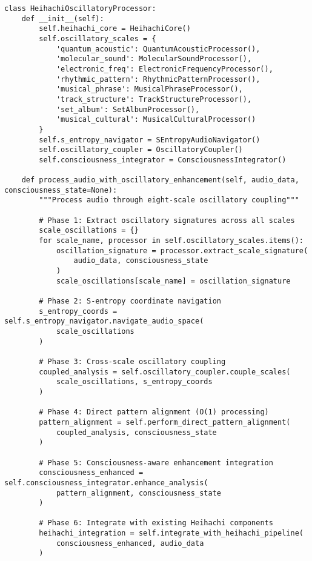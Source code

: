 \documentclass[12pt,a4paper]{article}
\begin{document}
\begin{lstlisting}[style=pythonstyle, caption=Heihachi Oscillatory Enhancement Integration]
class HeihachiOscillatoryProcessor:
    def __init__(self):
        self.heihachi_core = HeihachiCore()
        self.oscillatory_scales = {
            'quantum_acoustic': QuantumAcousticProcessor(),
            'molecular_sound': MolecularSoundProcessor(),
            'electronic_freq': ElectronicFrequencyProcessor(),
            'rhythmic_pattern': RhythmicPatternProcessor(),
            'musical_phrase': MusicalPhraseProcessor(),
            'track_structure': TrackStructureProcessor(),
            'set_album': SetAlbumProcessor(),
            'musical_cultural': MusicalCulturalProcessor()
        }
        self.s_entropy_navigator = SEntropyAudioNavigator()
        self.oscillatory_coupler = OscillatoryCoupler()
        self.consciousness_integrator = ConsciousnessIntegrator()
        
    def process_audio_with_oscillatory_enhancement(self, audio_data, consciousness_state=None):
        """Process audio through eight-scale oscillatory coupling"""
        
        # Phase 1: Extract oscillatory signatures across all scales
        scale_oscillations = {}
        for scale_name, processor in self.oscillatory_scales.items():
            oscillation_signature = processor.extract_scale_signature(
                audio_data, consciousness_state
            )
            scale_oscillations[scale_name] = oscillation_signature
        
        # Phase 2: S-entropy coordinate navigation
        s_entropy_coords = self.s_entropy_navigator.navigate_audio_space(
            scale_oscillations
        )
        
        # Phase 3: Cross-scale oscillatory coupling
        coupled_analysis = self.oscillatory_coupler.couple_scales(
            scale_oscillations, s_entropy_coords
        )
        
        # Phase 4: Direct pattern alignment (O(1) processing)
        pattern_alignment = self.perform_direct_pattern_alignment(
            coupled_analysis, consciousness_state
        )
        
        # Phase 5: Consciousness-aware enhancement integration
        consciousness_enhanced = self.consciousness_integrator.enhance_analysis(
            pattern_alignment, consciousness_state
        )
        
        # Phase 6: Integrate with existing Heihachi components
        heihachi_integration = self.integrate_with_heihachi_pipeline(
            consciousness_enhanced, audio_data
        )
        

\end{lstlisting}
\end{document}
